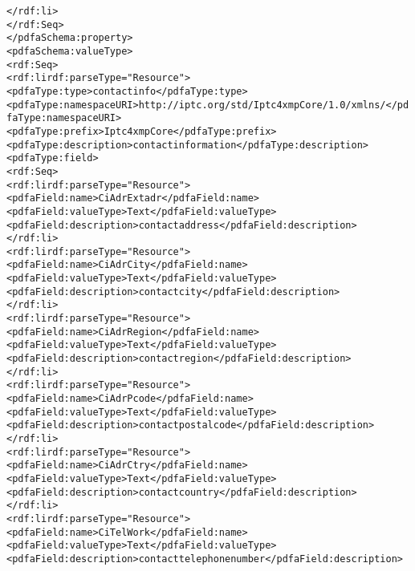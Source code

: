 \begin{alltt}
                      </rdf:li>
                    </rdf:Seq>
                  </pdfaSchema:property>
                  <pdfaSchema:valueType>
                    <rdf:Seq>
                      <rdf:li rdf:parseType="Resource">
                        <pdfaType:type>contactinfo</pdfaType:type>
                        <pdfaType:namespaceURI>http://iptc.org/std/Iptc4xmpCore/1.0/xmlns/</pdfaType:namespaceURI>
                        <pdfaType:prefix>Iptc4xmpCore</pdfaType:prefix>
                        <pdfaType:description>contact information</pdfaType:description>
                        <pdfaType:field>
                          <rdf:Seq>
                            <rdf:li rdf:parseType="Resource">
                              <pdfaField:name>CiAdrExtadr</pdfaField:name>
                              <pdfaField:valueType>Text</pdfaField:valueType>
                              <pdfaField:description>contact address</pdfaField:description>
                            </rdf:li>
                            <rdf:li rdf:parseType="Resource">
                              <pdfaField:name>CiAdrCity</pdfaField:name>
                              <pdfaField:valueType>Text</pdfaField:valueType>
                              <pdfaField:description>contact city</pdfaField:description>
                            </rdf:li>
                            <rdf:li rdf:parseType="Resource">
                              <pdfaField:name>CiAdrRegion</pdfaField:name>
                              <pdfaField:valueType>Text</pdfaField:valueType>
                              <pdfaField:description>contact region</pdfaField:description>
                            </rdf:li>
                            <rdf:li rdf:parseType="Resource">
                              <pdfaField:name>CiAdrPcode</pdfaField:name>
                              <pdfaField:valueType>Text</pdfaField:valueType>
                              <pdfaField:description>contact postal code</pdfaField:description>
                            </rdf:li>
                            <rdf:li rdf:parseType="Resource">
                              <pdfaField:name>CiAdrCtry</pdfaField:name>
                              <pdfaField:valueType>Text</pdfaField:valueType>
                              <pdfaField:description>contact country</pdfaField:description>
                            </rdf:li>
                            <rdf:li rdf:parseType="Resource">
                              <pdfaField:name>CiTelWork</pdfaField:name>
                              <pdfaField:valueType>Text</pdfaField:valueType>
                              <pdfaField:description>contact telephone number</pdfaField:description>

\end{alltt}
